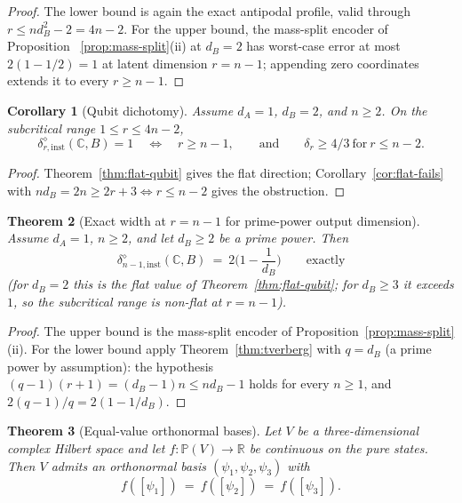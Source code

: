 \documentclass[11pt,a4paper]{article}
\newtheorem{theorem}{Theorem}[section]
\newtheorem{corollary}[theorem]{Corollary}
\begin{document}
\begin{proof}
The lower bound is again the exact antipodal profile, valid through $r\le
nd_B^2-2=4n-2$. For the upper bound, the mass-split encoder of Proposition
~\ref{prop:mass-split}(ii) at $d_B=2$ has worst-case error at most
$2(1-1/2)=1$ at latent dimension $r=n-1$; appending zero coordinates extends it to
every $r\ge n-1$.
\end{proof}

\begin{corollary}[Qubit dichotomy]
\label{cor:qubit-dichotomy}
Assume $d_A=1$, $d_B=2$, and $n\ge2$. On the subcritical range $1\le r\le4n-2$,
\[
\delta_{r,\mathrm{inst}}^{\diamond}(\mathbb C,B)=1\quad\Longleftrightarrow\quad
r\ge n-1,
\qquad\text{and}\qquad
\delta_r\ge4/3\ \text{for}\ r\le n-2.
\]
\end{corollary}

\begin{proof}
Theorem~\ref{thm:flat-qubit} gives the flat direction; Corollary~\ref{cor:flat-fails}
with $nd_B=2n\ge2r+3\iff r\le n-2$ gives the obstruction.
\end{proof}

\begin{theorem}[Exact width at $r=n-1$ for prime-power output dimension]
\label{thm:mass-exact}
Assume $d_A=1$, $n\ge2$, and let $d_B\ge2$ be a prime power. Then
\[
\delta_{n-1,\mathrm{inst}}^{\diamond}(\mathbb C,B)
\ =\ 2\Big(1-\frac1{d_B}\Big)
\qquad\text{exactly}
\]
(for $d_B=2$ this is the flat value of Theorem~\ref{thm:flat-qubit}; for $d_B\ge3$ it
exceeds $1$, so the subcritical range is non-flat at $r=n-1$).
\end{theorem}

\begin{proof}
The upper bound is the mass-split encoder of Proposition~\ref{prop:mass-split}(ii).
For the lower bound apply Theorem~\ref{thm:tverberg} with $q=d_B$ (a prime power by
assumption): the hypothesis $(q-1)(r+1)=(d_B-1)n\le nd_B-1$ holds for every $n\ge1$,
and $2(q-1)/q=2(1-1/d_B)$.
\end{proof}


\begin{theorem}[Equal-value orthonormal bases]
\label{thm:equal-basis}
Let $V$ be a three-dimensional complex Hilbert space and let
$f\colon\mathbb P(V)\to\mathbb R$ be continuous on the pure states. Then $V$
admits an orthonormal basis $(\psi_1,\psi_2,\psi_3)$ with
\[
f([\psi_1])\ =\ f([\psi_2])\ =\ f([\psi_3]).
\]
\end{theorem}
\end{document}
